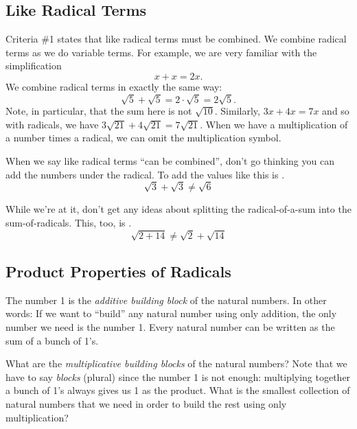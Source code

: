 \subsection{Like Radical Terms}

Criteria \#1 states that like radical terms must be combined. We combine radical terms as we do variable terms. For example, we are very familiar with the simplification \[x + x = 2x.\] We combine radical terms in exactly the same way: \[\sqrt5 + \sqrt5 = 2\cdot\sqrt5 = 2\sqrt5.\]
Note, in particular, that the sum here is not $\sqrt{10}$. Similarly, $3x + 4x = 7x$ and so with radicals, we have $3\sqrt{21} + 4\sqrt{21} = 7\sqrt{21}$. When we have a multiplication of a number times a radical, we can omit the multiplication symbol.

\begin{boxedwarning}
When we say like radical terms ``can be combined'', don't go thinking you can add the numbers under the radical. To add the values like this is \evilandwrong.
\[ \sqrt{3} + \sqrt{3} \neq \sqrt{6}\]

While we're at it, don't get any ideas about splitting the radical-of-a-sum into the sum-of-radicals. This, too, is \evilandwrong.
\[\sqrt{2+14} \neq \sqrt{2} +\sqrt{14}\]
\end{boxedwarning}

%
%

\subsection{Product Properties of Radicals}

\begin{boxedexplore}
The number 1 is the \textit{additive building block} of the natural numbers. In other words: If we want to ``build'' any natural number using only addition, the only number we need is the number 1. Every natural number can be written as the sum of a bunch of 1's.

What are the \textit{multiplicative building blocks} of the natural numbers? Note that we have to say \textit{blocks} (plural) since the number 1 is not enough: multiplying together a bunch of 1's always gives us 1 as the product. What is the smallest collection of natural numbers that we need in order to build the rest using only multiplication?
\end{boxedexplore}

